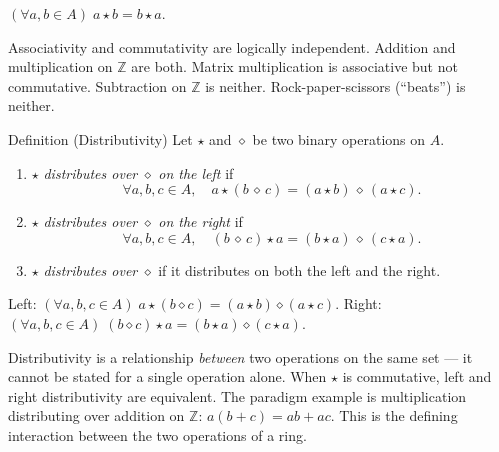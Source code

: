 \begin{remark}
$(\forall a, b \in A)\; a \star b = b \star a$.
\end{remark}

\begin{remark}
Associativity and commutativity are logically independent.
Addition and multiplication on $\mathbb{Z}$ are both.
Matrix multiplication is associative but not commutative.
Subtraction on $\mathbb{Z}$ is neither.
Rock-paper-scissors (``beats'') is neither.
\end{remark}

\begin{definitionbox}{Definition (Distributivity)}
\label{def:distributivity}
Let $\star$ and $\diamond$ be two binary operations on $A$.
\begin{enumerate}[label=(\roman*)]
  \item $\star$ \emph{distributes over} $\diamond$ \emph{on the left} if
        \[
          \forall a, b, c \in A,\quad
          a \star (b \,\diamond\, c)
          = (a \star b) \,\diamond\, (a \star c).
        \]
  \item $\star$ \emph{distributes over} $\diamond$ \emph{on the right} if
        \[
          \forall a, b, c \in A,\quad
          (b \,\diamond\, c) \star a
          = (b \star a) \,\diamond\, (c \star a).
        \]
  \item $\star$ \emph{distributes over} $\diamond$ if it distributes on
        both the left and the right.
\end{enumerate}
\end{definitionbox}

\begin{remark}
Left: $(\forall a,b,c \in A)\;
a \star (b \diamond c) = (a \star b) \diamond (a \star c)$.
Right: $(\forall a,b,c \in A)\;
(b \diamond c) \star a = (b \star a) \diamond (c \star a)$.
\end{remark}

\begin{remark}
Distributivity is a relationship \emph{between} two operations on the same
set — it cannot be stated for a single operation alone.
When $\star$ is commutative, left and right distributivity are equivalent.
The paradigm example is multiplication distributing over addition on
$\mathbb{Z}$: $a(b + c) = ab + ac$.
This is the defining interaction between the two operations of a ring.
\end{remark}

